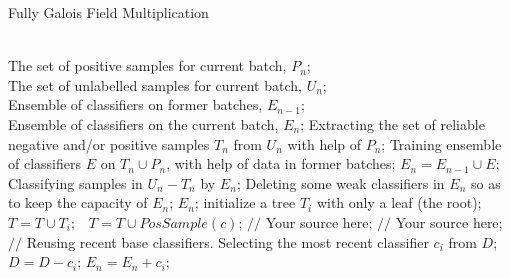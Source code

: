 \renewcommand{\algorithmicrequire}{ \textbf{Input:}} %
\renewcommand{\algorithmicensure}{ \textbf{Output:}} %
\begin{algorithm}[htb] 
\caption{Fully Galois Field Multiplication} 
\label{alg:fully-GFM} 
\begin{algorithmic}[1] %
\REQUIRE ~~\\ %
The set of positive samples for current batch, $P_n$;\\
The set of unlabelled samples for current batch, $U_n$;\\
Ensemble of classifiers on former batches, $E_{n-1}$;
\ENSURE ~~\\ %
Ensemble of classifiers on the current batch, $E_n$;
\STATE Extracting the set of reliable negative and/or positive samples $T_n$ from $U_n$ with help of $P_n$; 
\label{ code:fram:extract }%
\STATE Training ensemble of classifiers $E$ on $T_n \cup P_n$, with help of data in former batches; 
\label{code:fram:trainbase}
\STATE $E_n=E_{n-1}\cup E$; 
\label{code:fram:add}
\STATE Classifying samples in $U_n-T_n$ by $E_n$; 
\label{code:fram:classify}
\STATE Deleting some weak classifiers in $E_n$ so as to keep the capacity of $E_n$; 
\label{code:fram:select}
\RETURN $E_n$; %
\STATE initialize a tree $T_{i}$ with only a leaf (the root);\
\STATE $T=T \cup T_{i};$\
\ENDFOR
{} 
\label{code:TrainBase:getc}
\STATE $T=T \cup PosSample(c)$; 
\label{code:TrainBase:pos}
\ENDFOR
{}
\STATE $//$ Your source here;
\ENDFOR
{}
\STATE $//$ Your source here;
\ENDFOR
\STATE $//$ Reusing recent base classifiers. 
\label{code:recentStart}
\WHILE {$(|E_n| \leq L_1 )and( D \neq \phi)$}
\STATE Selecting the most recent classifier $c_i$ from $D$;
\STATE $D=D-c_i$;
\STATE $E_n=E_n+c_i$;
\ENDWHILE 
\label{code:recentEnd}
\end{algorithmic}
\end{algorithm}



%
